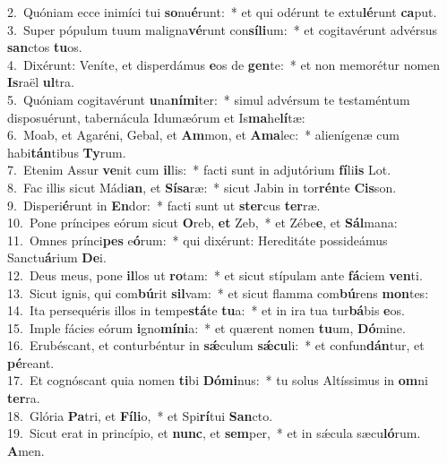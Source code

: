 {2.~}Quóniam ecce inimíci tui \textbf{so}nu\textbf{é}runt:~* et qui odérunt te extu\textbf{lé}runt \textbf{ca}put.\\
{3.~}Super pópulum tuum maligna\textbf{vé}runt con\textbf{sí}\textbf{li}um:~* et cogitavérunt advérsus \textbf{san}ctos \textbf{tu}os.\\
{4.~}Dixérunt: Veníte, et disperdámus \textbf{e}os de \textbf{gen}te:~* et non memorétur nomen \textbf{Is}raël \textbf{ul}tra.\\
{5.~}Quóniam cogitavérunt \textbf{u}na\textbf{ní}\textbf{mi}ter:~* simul advérsum te testaméntum disposuérunt, tabernácula Idumæórum et Is\textbf{ma}he\textbf{lí}tæ:\\
{6.~}Moab, et Agaréni, Gebal, et \textbf{Am}mon, et \textbf{A}\textbf{ma}lec:~* alienígenæ cum habi\textbf{tán}tibus \textbf{Ty}rum.\\
{7.~}Etenim Assur \textbf{ve}nit cum \textbf{il}lis:~* facti sunt in adjutórium \textbf{fí}li\textbf{is} Lot.\\
{8.~}Fac illis sicut Mádi\textbf{an}, et \textbf{Sí}\textbf{sa}ræ:~* sicut Jabin in tor\textbf{rén}te \textbf{Cis}son.\\
{9.~}Disperi\textbf{é}runt in \textbf{En}dor:~* facti sunt ut \textbf{ster}cus \textbf{ter}ræ.\\
{10.~}Pone príncipes eórum sicut \textbf{O}reb, \textbf{et} Zeb,~* et Zébe\textbf{e}, et \textbf{Sál}mana:\\
{11.~}Omnes prínci\textbf{pes} e\textbf{ó}rum:~* qui dixérunt: Hereditáte possideámus Sanctu\textbf{á}rium \textbf{De}i.\\
{12.~}Deus meus, pone \textbf{il}los ut \textbf{ro}tam:~* et sicut stípulam ante \textbf{fá}ciem \textbf{ven}ti.\\
{13.~}Sicut ignis, qui com\textbf{bú}rit \textbf{sil}vam:~* et sicut flamma com\textbf{bú}rens \textbf{mon}tes:\\
{14.~}Ita persequéris illos in tempe\textbf{stá}te \textbf{tu}a:~* et in ira tua tur\textbf{bá}bis \textbf{e}os.\\
{15.~}Imple fácies eórum \textbf{i}gno\textbf{mí}\textbf{ni}a:~* et quærent nomen \textbf{tu}um, \textbf{Dó}mine.\\
{16.~}Erubéscant, et conturbéntur in \textbf{sǽ}culum \textbf{sǽ}\textbf{cu}li:~* et confun\textbf{dán}tur, et \textbf{pé}reant.\\
{17.~}Et cognóscant quia nomen \textbf{ti}bi \textbf{Dó}\textbf{mi}nus:~* tu solus Altíssimus in \textbf{om}ni \textbf{ter}ra.\\
{18.~}Glória \textbf{Pa}tri, et \textbf{Fí}\textbf{li}o,~* et Spi\textbf{rí}tui \textbf{San}cto.\\
{19.~}Sicut erat in princípio, et \textbf{nunc}, et \textbf{sem}per,~* et in sǽcula sæcu\textbf{ló}rum. \textbf{A}men.\\
